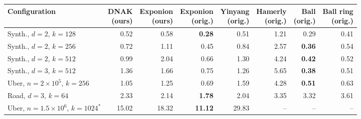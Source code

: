 \begin{tabular}{lrrrrrrr}
\toprule
Configuration & \shortstack[r]{DNAK\\ (ours)} & \shortstack[r]{Exponion\\ (ours)} & \shortstack[r]{Exponion\\ (orig.)} & \shortstack[r]{Yinyang\\ (orig.)} & \shortstack[r]{Hamerly\\ (orig.)} & \shortstack[r]{Ball\\ (orig.)} & \shortstack[r]{Ball ring\\ (orig.)} \\
\midrule
Synth., $d{=}2$, $k{=}128$ & 0.52 & 0.58 & \textbf{0.28} & 0.51 & 1.21 & 0.29 & 0.41 \\
Synth., $d{=}2$, $k{=}256$ & 0.72 & 1.11 & 0.45 & 0.84 & 2.57 & \textbf{0.36} & 0.54 \\
Synth., $d{=}2$, $k{=}512$ & 0.99 & 2.04 & 0.66 & 1.30 & 4.24 & \textbf{0.42} & 0.52 \\
Synth., $d{=}3$, $k{=}512$ & 1.36 & 1.66 & 0.75 & 1.26 & 5.65 & \textbf{0.38} & 0.51 \\
Uber, $n{=}2{\times}10^5$, $k{=}256$ & 1.05 & 1.25 & 0.69 & 1.59 & 4.28 & \textbf{0.51} & 0.63 \\
Road, $d{=}3$, $k{=}64$ & 2.33 & 2.14 & \textbf{1.78} & 2.04 & 3.35 & 3.32 & 3.61 \\
Uber, $n{=}1.5{\times}10^6$, $k{=}1024^\ast$ & 15.02 & 18.32 & \textbf{11.12} & 29.83 & -- & -- & -- \\
\bottomrule
\end{tabular}
